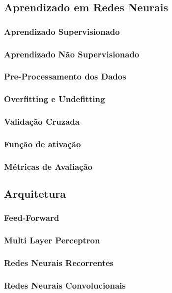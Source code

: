     \subsection{Aprendizado em Redes Neurais}
        \subsubsection{Aprendizado Supervisionado}
        \subsubsection{Aprendizado Não Supervisionado}
        \subsubsection{Pre-Processamento dos Dados}
        \subsubsection{Overfitting e Undefitting}
        \subsubsection{Validação Cruzada}
        \subsubsection{Função de ativação}
        \subsubsection{Métricas de Avaliação}
        
            
    \subsection{Arquitetura}
        \subsubsection{Feed-Forward}
        \subsubsection{Multi Layer Perceptron}
        \subsubsection{Redes Neurais Recorrentes}
        \subsubsection{Redes Neurais Convolucionais}
